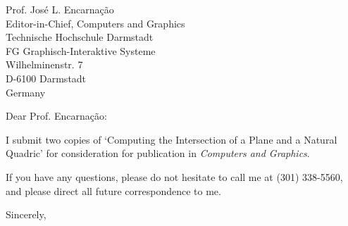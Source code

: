 \signature{Prof. John K. Johnstone\\jj@cs.jhu.edu}

\begin{letter}
{Prof. Jos\'{e} L. Encarna\c{c}\~{a}o\\
Editor-in-Chief, Computers and Graphics\\
Technische Hochschule Darmstadt\\
FG Graphisch-Interaktive Systeme\\
Wilhelminenstr. 7\\
D-6100 Darmstadt\\
Germany
}

\opening{Dear Prof. Encarna\c{c}\~{a}o:}

I submit two copies of `Computing the Intersection of a Plane
and a Natural Quadric' for consideration for publication in 
{\em Computers and Graphics}.

If you have any questions, please do not hesitate to call
me at (301) 338-5560, and 
please direct all future correspondence to me.

\closing{Sincerely,}
\end{letter}


